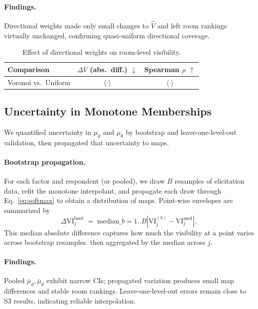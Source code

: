 \documentclass[final,3p,times,review]{elsarticle}
\begin{document}
\paragraph{Findings.}
Directional weights made only small changes to $\widehat{V}$ and left room rankings virtually unchanged, confirming quasi-uniform directional coverage.

\begin{table}[H]
\centering
\caption{Effect of directional weights on room-level visibility.}
\label{tab:omega}
\begin{tabular}{@{}lcc@{}}
\toprule
Comparison & \(\Delta V\) (abs.\ diff.) \(\downarrow\) & Spearman \(\rho\) \(\uparrow\) \\
\midrule
Voronoi vs.\ Uniform & \(\langle\cdot\rangle\) & \(\langle\cdot\rangle\) \\
\bottomrule
\end{tabular}
\end{table}


\subsection{Uncertainty in Monotone Memberships}
We quantified uncertainty in $\mu_d$ and $\mu_\theta$ by bootstrap and leave-one-level-out validation, then propagated that uncertainty to maps.

\paragraph{Bootstrap propagation.}
For each factor and respondent (or pooled), we draw $B$ resamples of elicitation data, refit the monotone interpolant, and propagate each draw through Eq.~\eqref{eq:softmax} to obtain a distribution of maps. Point-wise envelopes are summarized by
\begin{equation}
\Delta \mathrm{VI}_j^{\mathrm{boot}} \;=\; \mathrm{median}\_{b=1..B}\left| \mathrm{VI}_j^{(b)} - \mathrm{VI}_j^{\mathrm{med}} \right|,
\label{eq:boot-map-diff}
\end{equation}
This median absolute difference captures how much the visibility at a point varies across bootstrap resamples.
then aggregated by the median across $j$.

\paragraph{Findings.}
Pooled $\bar{\mu}_d,\bar{\mu}_\theta$ exhibit narrow CIs; propagated variation produces small map differences and stable room rankings. Leave-one-level-out errors remain close to S3 results, indicating reliable interpolation.
\end{document}
